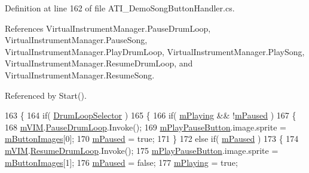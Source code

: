 Definition at line 162 of file A\+T\+I\+\_\+\+Demo\+Song\+Button\+Handler.\+cs.



References Virtual\+Instrument\+Manager.\+Pause\+Drum\+Loop, Virtual\+Instrument\+Manager.\+Pause\+Song, Virtual\+Instrument\+Manager.\+Play\+Drum\+Loop, Virtual\+Instrument\+Manager.\+Play\+Song, Virtual\+Instrument\+Manager.\+Resume\+Drum\+Loop, and Virtual\+Instrument\+Manager.\+Resume\+Song.



Referenced by Start().


\begin{DoxyCode}
163     \{
164         \textcolor{keywordflow}{if}( \hyperlink{class_a_t_i___demo_song_button_handler_a772b617c22a316a99f3a4b6979d0657a}{DrumLoopSelector} )
165         \{
166             \textcolor{keywordflow}{if}( \hyperlink{class_a_t_i___demo_song_button_handler_aefbba0db111a0d4ba1b1d9f5c1cae41d}{mPlaying} && !\hyperlink{class_a_t_i___demo_song_button_handler_abee877053d95bfba813d61d5a5d87a23}{mPaused} )
167             \{
168                 \hyperlink{class_a_t_i___demo_song_button_handler_ac078f283ce74a7b310ebb2cbbc55f70b}{mVIM}.\hyperlink{group___v_i_m_events_ga6de00a430321852cc3c8c4a213d62c70}{PauseDrumLoop}.Invoke();
169                 \hyperlink{class_a_t_i___demo_song_button_handler_a9f3be8593e24316510ca461f105061fd}{mPlayPauseButton}.image.sprite = \hyperlink{class_a_t_i___demo_song_button_handler_a9d62cca93ee54ba52e0c7de5f30d9490}{mButtonImages}[0];
170                 \hyperlink{class_a_t_i___demo_song_button_handler_abee877053d95bfba813d61d5a5d87a23}{mPaused} = \textcolor{keyword}{true};
171             \}
172             \textcolor{keywordflow}{else} \textcolor{keywordflow}{if}( \hyperlink{class_a_t_i___demo_song_button_handler_abee877053d95bfba813d61d5a5d87a23}{mPaused} )
173             \{
174                 \hyperlink{class_a_t_i___demo_song_button_handler_ac078f283ce74a7b310ebb2cbbc55f70b}{mVIM}.\hyperlink{group___v_i_m_events_ga54db2dc24076cd3cd130e95c2fd5bea0}{ResumeDrumLoop}.Invoke();
175                 \hyperlink{class_a_t_i___demo_song_button_handler_a9f3be8593e24316510ca461f105061fd}{mPlayPauseButton}.image.sprite = \hyperlink{class_a_t_i___demo_song_button_handler_a9d62cca93ee54ba52e0c7de5f30d9490}{mButtonImages}[1];
176                 \hyperlink{class_a_t_i___demo_song_button_handler_abee877053d95bfba813d61d5a5d87a23}{mPaused} = \textcolor{keyword}{false};
177                 \hyperlink{class_a_t_i___demo_song_button_handler_aefbba0db111a0d4ba1b1d9f5c1cae41d}{mPlaying} = \textcolor{keyword}{true};

\end{DoxyCode}
